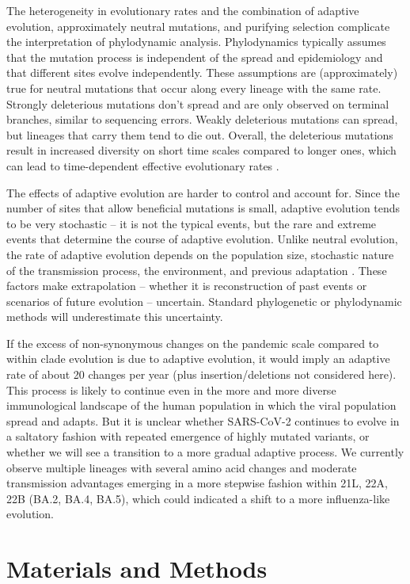 \documentclass[aps,rmp, twocolumn]{revtex4}
\begin{document}
The heterogeneity in evolutionary rates and the combination of adaptive evolution, approximately neutral mutations, and purifying selection complicate the interpretation of phylodynamic analysis.
Phylodynamics typically assumes that the mutation process is independent of the spread and epidemiology and that different sites evolve independently.
These assumptions are (approximately) true for neutral mutations that occur along every lineage with the same rate.
Strongly deleterious mutations don't spread and are only observed on terminal branches, similar to sequencing errors.
Weakly deleterious mutations can spread, but lineages that carry them tend to die out.
Overall, the deleterious mutations result in increased diversity on short time scales compared to longer ones, which can lead to time-dependent effective evolutionary rates \citep{wertheim_purifying_2011}.

The effects of adaptive evolution are harder to control and account for.
Since the number of sites that allow beneficial mutations is small, adaptive evolution tends to be very stochastic -- it is not the typical events, but the rare and extreme events that determine the course of adaptive evolution.
Unlike neutral evolution, the rate of adaptive evolution depends on the population size, stochastic nature of the transmission process, the environment, and previous adaptation \citep{neher_genetic_2013}.
These factors make extrapolation -- whether it is reconstruction of past events or scenarios of future evolution -- uncertain.
Standard phylogenetic or phylodynamic methods will underestimate this uncertainty.

If the excess of non-synonymous changes on the pandemic scale compared to within clade evolution is due to adaptive evolution, it would imply an adaptive rate of about 20 changes per year (plus insertion/deletions not considered here).
This process is likely to continue even in the more and more diverse immunological landscape of the human population in which the viral population spread and adapts.
But it is unclear whether SARS-CoV-2 continues to evolve in a saltatory fashion with repeated emergence of highly mutated variants, or whether we will see a transition to a more gradual adaptive process.
We currently observe multiple lineages with several amino acid changes and moderate transmission advantages emerging in a more stepwise fashion within 21L, 22A, 22B (BA.2, BA.4, BA.5), which could indicated a shift to a more influenza-like evolution.

\section*{Materials and Methods}
\end{document}
